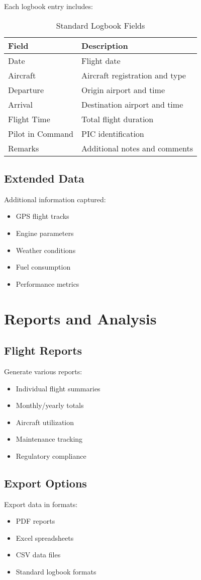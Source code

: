 Each logbook entry includes:

\begin{table}[H]
\centering
\begin{tabular}{@{}lp{8cm}@{}}
\toprule
\textbf{Field} & \textbf{Description} \\
\midrule
Date & Flight date \\
Aircraft & Aircraft registration and type \\
Departure & Origin airport and time \\
Arrival & Destination airport and time \\
Flight Time & Total flight duration \\
Pilot in Command & PIC identification \\
Remarks & Additional notes and comments \\
\bottomrule
\end{tabular}
\caption{Standard Logbook Fields}
\label{tab:logbook_fields}
\end{table}

\subsection{Extended Data}

Additional information captured:
\begin{itemize}
    \item GPS flight tracks
    \item Engine parameters
    \item Weather conditions
    \item Fuel consumption
    \item Performance metrics
\end{itemize}

\section{Reports and Analysis}

\subsection{Flight Reports}

Generate various reports:
\begin{itemize}
    \item Individual flight summaries
    \item Monthly/yearly totals
    \item Aircraft utilization
    \item Maintenance tracking
    \item Regulatory compliance
\end{itemize}

\subsection{Export Options}

Export data in formats:
\begin{itemize}
    \item PDF reports
    \item Excel spreadsheets
    \item CSV data files
    \item Standard logbook formats
\end{itemize}
